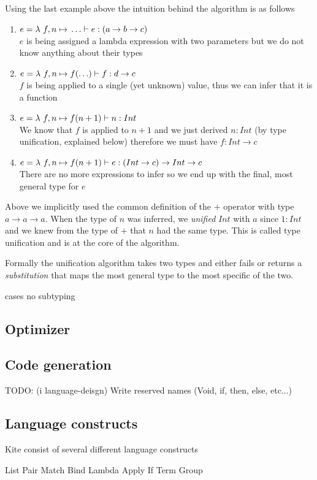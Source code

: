 Using the last example above the intuition behind the algorithm is as follows

\begin{enumerate}
\item $e = \lambda{} \ f, n \mapsto{} \ldots \vdash e: (a \to b \to c)$ \\
  $e$ is being assigned a lambda expression with two parameters but we do not know anything about their types
\item $e = \lambda{} \ f, n \mapsto{} f(\ldots) \vdash f: d \to c$ \\
  $f$ is being applied to a single (yet unknown) value, thus we can infer that it is a function
\item $e = \lambda{} \ f, n \mapsto{} f(n + 1) \vdash n : Int$ \\
  We know that $f$ is applied to $n+1$ and we just derived $n:Int$ (by type unification, explained below) therefore we must have $f:Int \to c$
\item $e = \lambda{} \ f, n \mapsto{} f(n + 1) \vdash e : (Int \to c) \to Int \to c$ \\
  There are no more expressions to infer so we end up with the final, most general type for $e$
\end{enumerate}


Above we implicitly used the common definition of the $+$ operator with type $a \to a \to a$. When the type of $n$ was inferred, we \emph{unified} $Int$ with $a$ since $1 : Int$ and we knew from the type of $+$ that $n$ had the same type. This is called type unification and is at the core of the algorithm.

Formally the unification algorithm takes two types and either fails or returns a \emph{substitution} that maps the most general type to the most specific of the two.


cases
no subtyping



\subsection{Optimizer}
\subsection{Code generation}

TODO: (i language-deisgn) Write reserved names (Void, if, then, else, etc...)

\subsection{Language constructs}

Kite consist of several different language constructs

List
Pair
Match
Bind
Lambda
Apply
If
Term
Group



